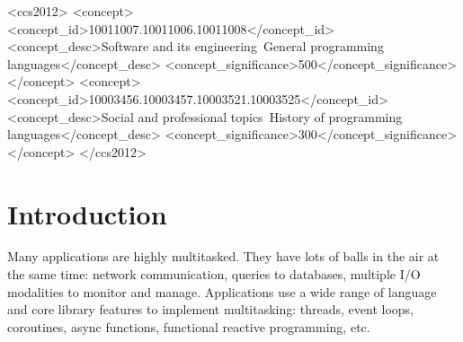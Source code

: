 \documentclass[acmsmall,anonymous,review]{acmart}\settopmatter{printfolios=true,printccs=false,printacmref=false}
\begin{document}
\begin{CCSXML}
<ccs2012>
<concept>
<concept_id>10011007.10011006.10011008</concept_id>
<concept_desc>Software and its engineering~General programming languages</concept_desc>
<concept_significance>500</concept_significance>
</concept>
<concept>
<concept_id>10003456.10003457.10003521.10003525</concept_id>
<concept_desc>Social and professional topics~History of programming languages</concept_desc>
<concept_significance>300</concept_significance>
</concept>
</ccs2012>
\end{CCSXML}




\maketitle




\section{Introduction}

Many applications are highly multitasked.
They have lots of balls in the air at the same time: network communication, queries to databases, multiple I/O modalities to monitor and manage.
Applications use a wide range of language and core library features to implement multitasking: threads, event loops, coroutines, async functions, functional reactive programming, etc.\footnotemark{}
\end{document}
